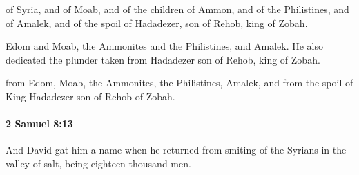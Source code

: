 			\begin{versebox}
					\item[BHS] 
					\item[ASV] of Syria, and of Moab, and of the children of Ammon, and of the Philistines, and of Amalek, and of the spoil of Hadadezer, son of Rehob, king of Zobah.
					\item[NIV] Edom and Moab, the Ammonites and the Philistines, and Amalek. He also dedicated the plunder taken from Hadadezer son of Rehob, king of Zobah.
					\item[NRSV] from Edom, Moab, the Ammonites, the Philistines, Amalek, and from the spoil of King Hadadezer son of Rehob of Zobah.
			\end{versebox}

		\paragraph{2 Samuel 8:13} %
			\label{2SAMUEL-8-13}

			And David gat him a name when he returned from smiting of the Syrians in the valley of salt, being eighteen thousand men.

